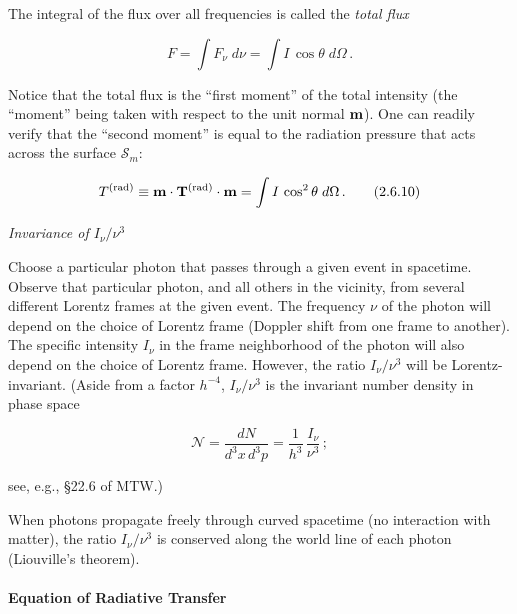 The integral of the flux over all frequencies is called the \textit{total flux}

\begin{equation}
F = \int F_\nu\;d\nu = \int I\,\cos\theta\;d\Omega\,.
\tag{2.6.9}
\end{equation}

Notice that the total flux is the ``first moment'' of the total intensity (the
``moment'' being taken with respect to the unit normal $\mathbf{m}$).  One can readily
verify that the ``second moment'' is equal to the radiation pressure that acts
across the surface $\mathscr{S}_m$:

\begin{equation}
T^{(\text{rad})} \equiv \mathbf{m}\cdot\mathbf{T}^{(\text{rad})}\cdot\mathbf{m}
= \int I\,\cos^2\theta\;d\Omega\,.
\tag{2.6.10}
\end{equation}

\bigskip
\textit{Invariance of $I_\nu/\nu^3$}

Choose a particular photon that passes through a given event in spacetime.
Observe that particular photon, and all others in the vicinity, from several different
Lorentz frames at the given event.  The frequency $\nu$ of the photon will depend
on the choice of Lorentz frame (Doppler shift from one frame to another).
The specific intensity $I_\nu$ in the frame neighborhood of the photon will also depend
on the choice of Lorentz frame.  However, the ratio $I_\nu/\nu^3$ will be Lorentz-
invariant. (Aside from a factor $h^{-4}$, $I_\nu/\nu^3$ is the invariant number density in
phase space

\begin{equation}
\mathscr{N} = \frac{dN}{d^3x\,d^3p} = \frac{1}{h^3}\,\frac{I_\nu}{\nu^3}\,;
\tag{2.6.11}
\end{equation}

see, e.g., \S22.6 of MTW.)

When photons propagate freely through curved spacetime (no interaction with
matter), the ratio $I_\nu/\nu^3$ is conserved along the world line of each photon
(Liouville's theorem).

\paragraph*{Equation of Radiative Transfer}

